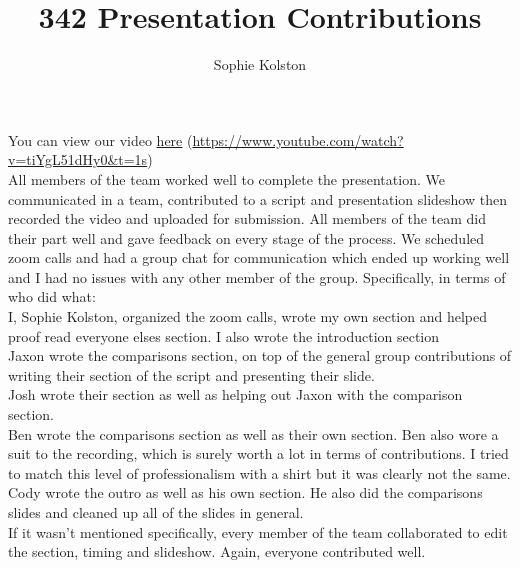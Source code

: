 \documentclass{article}
\begin{document}
\title{342 Presentation Contributions}
\author{Sophie Kolston}
\date{}

\maketitle


You can view our video \href{https://www.youtube.com/watch?v=tiYgL51dHy0&t=1s}{here} (\url{https://www.youtube.com/watch?v=tiYgL51dHy0&t=1s}) \\

All members of the team worked well to complete the presentation. We communicated in a team, contributed to a script and presentation slideshow then recorded the video and uploaded for submission. All members of the team did their part well and gave feedback on every stage of the process. We scheduled zoom calls and had a group chat for communication which ended up working well and I had no issues with any other member of the group. Specifically, in terms of who did what: \\

I, Sophie Kolston, organized the zoom calls, wrote my own section and helped proof read everyone elses section. I also wrote the introduction section \\

Jaxon wrote the comparisons section, on top of the general group contributions of writing their section of the script and presenting their slide. \\

Josh wrote their section as well as helping out Jaxon with the comparison section. \\

Ben wrote the comparisons section as well as their own section. Ben also wore a suit to the recording, which is surely worth a lot in terms of contributions. I tried to match this level of professionalism with a shirt but it was clearly not the same. \\

Cody wrote the outro as well as his own section. He also did the comparisons slides and cleaned up all of the slides in general.\\

If it wasn't mentioned specifically, every member of the team collaborated to edit the section, timing and slideshow. Again, everyone contributed well. 
\end{document}
